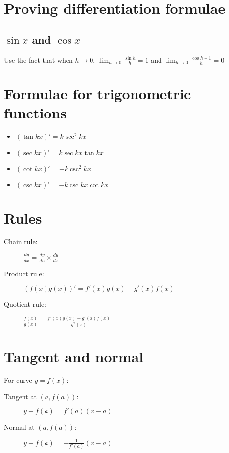 \section{Proving differentiation formulae}
\subsection{$\sin x$ and $\cos x$}
Use the fact that when $h\rightarrow0$, $\lim_{h\rightarrow0} \frac{\sin h}{h} = 1$ 
and $\lim_{h\rightarrow0} \frac{\cos h - 1}{h} = 0$

\section{Formulae for trigonometric functions}
\begin{itemize}
    \item $(\tan kx)' = k\sec^2 kx$
    \item $(\sec kx)' = k\sec kx \tan kx$
    \item $(\cot kx)' = -k\csc^2 kx$
    \item $(\csc kx)' = -k\csc kx \cot kx$
\end{itemize}

\section{Rules}
\begin{description}
    \item[Chain rule:] $\frac{dy}{dx} = \frac{dy}{du} \times \frac{du}{dx}$
    \item[Product rule:] $(f(x)g(x))'=f'(x)g(x)+g'(x)f(x)$
    \item[Quotient rule:] $\frac{f(x)}{g(x)} = \frac{f'(x)g(x)-g'(x)f(x)}{g^2(x)}$
\end{description}


\section{Tangent and normal}
For curve $y=f(x)$:
\begin{description}
    \item[Tangent at $(a,f(a))$:] $y-f(a)=f'(a)(x-a)$
    \item[Normal at $(a,f(a))$:] $y-f(a)=-\frac{1}{f'(a)}(x-a)$
\end{description}